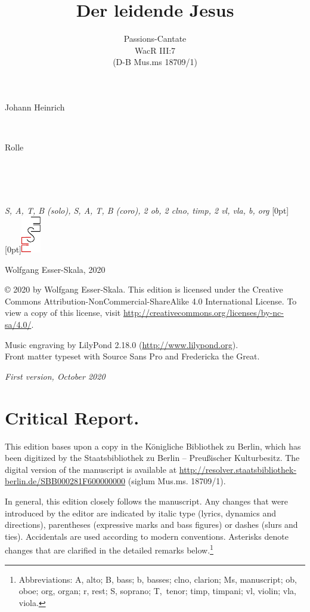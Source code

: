 \documentclass[parskip=full]{scrreprt}
\makeatletter
\DeclareRobustCommand{\sbseries}{\fontseries{sb}\selectfont}
\newcommand\fancytitlehead{
	\headingfont%
	\fontsize{80}{80}\selectfont\textcolor{black!80}{\@ifundefined{@shortname}{\@lastname}{\@shortname}.}\\[15pt]%
	\fontsize{50}{50}\selectfont\@ifundefined{@shorttitle}{\@title}{\@shorttitle}.%
}
\def\firstname#1{\def\@firstname{#1}}
\def\lastname#1{\def\@lastname{#1}}
\def\instrumentation#1{\def\@instrumentation{#1}}
\def\maketitle{%
\begin{titlepage}%
	\Large%
	{\@titlehead}%
	\vfill%
	{\strut\@firstname}\\%
	{\sbseries\color{oldred}\strut\@lastname}\\%
	{\strut\@namesuffix}%
	\vfill%
	{\sbseries\@title}\\%
	{\@subtitle}\\[\baselineskip]%
	{\itshape\@instrumentation}%
	\vfill%
	{\itshape\@parts}\hspace*{\fill}\raisebox{0pt}[0pt][0pt]{\includegraphics{ees_logo}}%
\end{titlepage}%
}
\newif\ifprintreport\printreportfalse
\makeatother
\begin{document}
\frenchspacing

\titlehead{\fancytitlehead}
\firstname{Johann Heinrich}
\lastname{Rolle}
\title{Der leidende Jesus}
\subtitle{Passions-Cantate\\WacR III:7\\(D-B Mus.ms 18709/1)}
\instrumentation{S, A, T, B (solo), S, A, T, B (coro), 2 ob, 2 clno, timp, 2 vl, vla, b, org}
\maketitle


\thispagestyle{empty}

\vspace*{\fill}

\hspace*{1em}Wolfgang Esser-Skala, 2020

© 2020 by Wolfgang Esser-Skala. This edition is licensed under the Creative Commons Attribution-NonCommercial-ShareAlike 4.0 International License. To view a copy of this license, visit \url{http://creativecommons.org/licenses/by-nc-sa/4.0/}.

Music engraving by LilyPond 2.18.0 (\url{http://www.lilypond.org}).\\
Front matter typeset with Source Sans Pro and Fredericka the Great.

\textit{First version, October 2020}

\vspace*{2cm}

\ifprintreport
\chapter*{Critical Report.}

This edition bases upon a copy in the Königliche Bibliothek zu Berlin, which has been digitized by the Staatsbibliothek zu Berlin – Preußischer Kulturbesitz. The digital version of the manuscript is available at \url{http://resolver.staatsbibliothek-berlin.de/SBB000281F600000000} (siglum Mus.ms. 18709/1).

In general, this edition closely follows the manuscript. Any changes that were introduced by the editor are indicated by italic type (lyrics, dynamics and directions), parentheses (expressive marks and bass figures) or dashes (slurs and ties). Accidentals are used according to modern conventions. Asterisks denote changes that are clarified in the detailed remarks below.\footnote{Abbreviations: A, alto; B, bass; b, basses; clno, clarion; Ms, manuscript; ob, oboe; org, organ; r, rest; S, soprano; T,~tenor; timp, timpani; vl, violin; vla, viola.}
\end{document}
